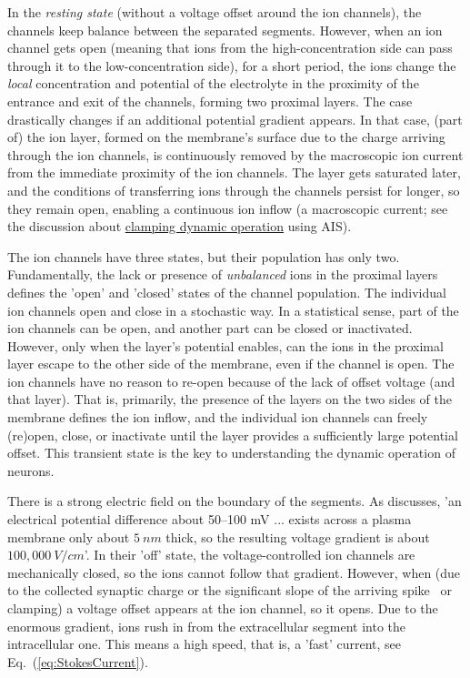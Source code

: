In the \textit{resting state} (without a voltage offset around the ion channels), the channels keep balance between the separated segments. 
However, when an ion channel gets open (meaning that ions from the high-concentration side can
pass through it to the low-concentration side), for a short period,
the ions change the \textit{local} concentration and potential of the electrolyte in the
proximity of the entrance and exit of the channels,
forming \hypertarget{membrane_layers}{two proximal layers}. 
The case drastically changes if an additional potential gradient appears.
In that case, (part of) the ion layer, formed on the
membrane's surface due to the charge arriving through the ion
channels, is  continuously removed by the macroscopic ion current from the immediate
proximity of the ion channels. The layer gets saturated later, and
the conditions of transferring ions
through the channels persist for longer, so they remain open, enabling a continuous
ion inflow (a macroscopic current; see the
discussion about  \hyperlink{voltage-clamping}{clamping dynamic operation} using  
\gls{AIS}).

The ion channels have three states, but their population has only two.
Fundamentally, the lack or presence of \textit{unbalanced} ions in the proximal layers defines the 'open' and 'closed' states of the channel population. The individual
ion channels open and close in a stochastic way. In a statistical sense, part of the ion channels can be open, and another part can be closed or inactivated.
However, only when the layer's potential enables, can the ions in the proximal layer
escape to the other side of the membrane, even if the channel is open. 
The ion channels have no reason to re-open because of the lack of offset voltage (and that layer).
That is, primarily, the presence of the layers on the two sides of the membrane defines the ion inflow,
and the individual ion channels  can freely (re)open, close, or inactivate
until the layer provides a sufficiently large potential offset.
This transient state is the key to understanding the dynamic operation of neurons.

There is a strong electric field on the boundary of the segments. 
As \cite{MolecularBiology:2002} discusses,
'an electrical potential difference about 50–100 mV ... exists across a plasma membrane only about $5\ nm$ thick,
 so the resulting voltage gradient is about $100,000\ V/cm$'.
In their 'off' state, the voltage-controlled ion channels are mechanically closed, so the ions cannot follow that gradient.  
However, when (due to the collected synaptic charge or the significant slope of the arriving spike~\cite{LosonczyIntegrative:2006} or clamping) a voltage offset appears at the  ion channel, so it opens. Due to the enormous gradient, ions rush in
from the extracellular segment into the intracellular one. This means a high speed, that is, a 'fast' current, see Eq.~(\ref{eq:StokesCurrent}).

